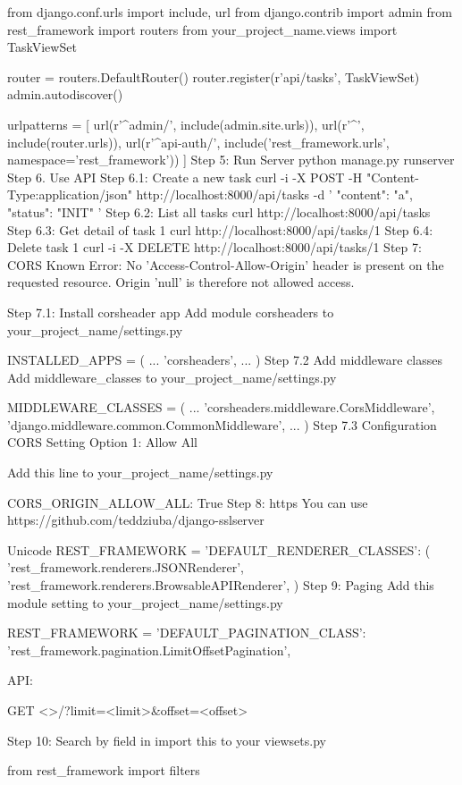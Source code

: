 from django.conf.urls import include, url
from django.contrib import admin
from rest_framework import routers
from your_project_name.views import TaskViewSet

router = routers.DefaultRouter()
router.register(r'api/tasks', TaskViewSet)
admin.autodiscover()

urlpatterns = [
    url(r'^admin/', include(admin.site.urls)),
    url(r'^', include(router.urls)),
    url(r'^api-auth/', include('rest_framework.urls', namespace='rest_framework'))
]
Step 5: Run Server
python manage.py runserver
Step 6. Use API
Step 6.1: Create a new task
curl -i -X POST -H "Content-Type:application/json" http://localhost:8000/api/tasks -d '{
  "content": "a",
  "status": "INIT"
}'
Step 6.2: List all tasks
curl http://localhost:8000/api/tasks
Step 6.3: Get detail of task 1
curl http://localhost:8000/api/tasks/1
Step 6.4: Delete task 1
curl -i -X DELETE http://localhost:8000/api/tasks/1
Step 7: CORS
Known Error: No 'Access-Control-Allow-Origin' header is present on the requested resource. Origin 'null' is therefore not allowed access.

Step 7.1: Install corsheader app
Add module corsheaders to your_project_name/settings.py

INSTALLED_APPS = (
    ...
    'corsheaders',
    ...
)
Step 7.2 Add middleware classes
Add middleware_classes to your_project_name/settings.py

MIDDLEWARE_CLASSES = (
    ...
    'corsheaders.middleware.CorsMiddleware',
    'django.middleware.common.CommonMiddleware',
    ...
)
Step 7.3 Configuration CORS Setting
Option 1: Allow All

Add this line to your_project_name/settings.py

CORS_ORIGIN_ALLOW_ALL: True
Step 8: https
You can use https://github.com/teddziuba/django-sslserver

Unicode
REST_FRAMEWORK = {
    'DEFAULT_RENDERER_CLASSES': (
        'rest_framework.renderers.JSONRenderer',
        'rest_framework.renderers.BrowsableAPIRenderer',
    )
}
Step 9: Paging
Add this module setting to your_project_name/settings.py


REST_FRAMEWORK = {
    'DEFAULT_PAGINATION_CLASS': 'rest_framework.pagination.LimitOffsetPagination',
}

API:


GET <>/?limit=<limit>&offset=<offset>

Step 10: Search by field in
import this to your viewsets.py


from rest_framework import filters

